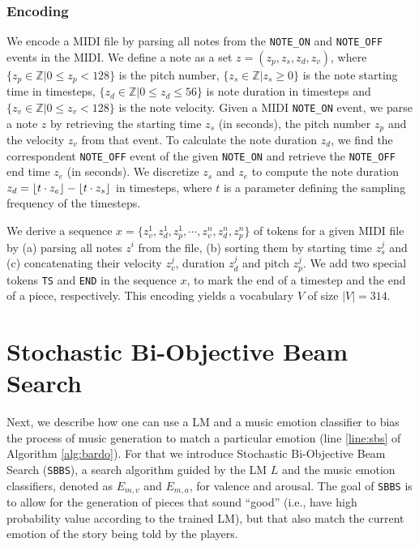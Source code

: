 \subsubsection{Encoding}

We encode a MIDI file by parsing all notes from the
\texttt{NOTE\_ON} and \texttt{NOTE\_OFF}
events in the MIDI. We define a note as a set $z = (z_p, z_s, z_d, z_v)$,
where $\{z_p \in \mathbb{Z} \vert 0 \leq z_p < 128 \}$ is the
pitch number, $\{z_s \in \mathbb{Z} \vert z_s \geq 0 \}$ is the note starting time
in timesteps,  $\{z_d \in \mathbb{Z} \vert 0 \leq z_d \leq 56\}$ is note duration
in timesteps and $\{z_v \in \mathbb{Z} \vert 0 \leq z_v < 128 \}$ is the
note velocity.
Given a MIDI \texttt{NOTE\_ON} event, we parse a note $z$ by retrieving
the starting time $z_s$ (in seconds), the pitch number $z_p$ and
the velocity $z_v$ from that event. To calculate the note duration
$z_d$, we find the correspondent \texttt{NOTE\_OFF} event of the given \texttt{NOTE\_ON}
and retrieve the \texttt{NOTE\_OFF} end time $z_e$ (in seconds). We discretize
$z_s$ and $z_e$ to compute the note duration $z_d = \lfloor t \cdot z_e\rfloor - \lfloor t \cdot z_s\rfloor$ in timesteps, where $t$ is a parameter defining
the sampling frequency of the timesteps.

We derive a sequence $x = \{z_v^1, z_{d}^1, z_{p}^1, \cdots, z_v^n,
z_{d}^n, z_p^n\}$ of tokens for a given MIDI file by (a)
parsing all notes $z^i$ from the file, (b) sorting them by
starting time $z_s^j$ and (c) concatenating their velocity $z_v^j$,
duration $z_d^j$ and pitch $z_p^j$. We add two special tokens
\texttt{TS} and \texttt{END} in the sequence $x$, to mark
the end of a timestep and the end of a piece, respectively.
This encoding yields a vocabulary $V$ of size $|V| = 314$.

\section{Stochastic Bi-Objective Beam Search}

Next, we describe how one can use a LM and a music emotion classifier to bias the process of music generation to match a particular emotion (line \ref{line:sbs} of Algorithm \ref{alg:bardo}). For that we introduce Stochastic Bi-Objective Beam Search (\texttt{SBBS}), a search algorithm guided by the LM $L$ and the music emotion classifiers, denoted as $E_{m, v}$ and $E_{m, a}$, for valence and arousal. The goal of \texttt{SBBS} is to allow for the generation of pieces that sound ``good'' (i.e., have high probability value according to the trained LM), but that also match the current emotion of the story being told by the players.

